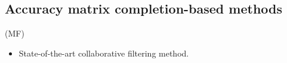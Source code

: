 \subsection{Accuracy matrix completion-based methods}

\begin{frame}{\Mf (MF)}
    \begin{itemize}
        \item State-of-the-art collaborative filtering method.
    \end{itemize}
\end{frame}